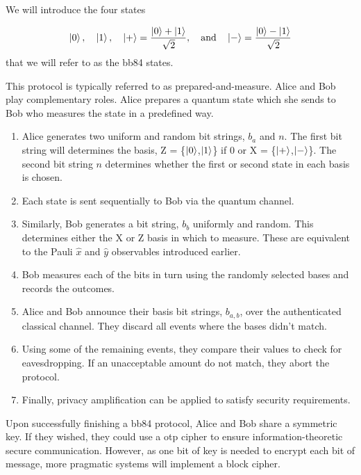 We will introduce the four states

\begin{equation}
	\ket{0}, \quad \ket{1}, \quad \ket{+} = \frac{\ket{0} + \ket{1}}{\sqrt{2}}, \quad \text{and} \quad \ket{-} = \frac{\ket{0} - \ket{1}}{\sqrt{2}}
\end{equation}
that we will refer to as the \ac{bb84} states.

This protocol is typically referred to as {\color{bristol-red}prepared-and-measure}. Alice and Bob play complementary roles. Alice {\color{bristol-red}prepares} a quantum state which she sends to Bob who {\color{bristol-red}measures} the state in a predefined way. 

\begin{algorithm}
\begin{enumerate}
	\item Alice generates two uniform and random bit strings, $b_a$ and $n$. The first bit string will determines the basis, Z = \{$\ket{0}$,$\ket{1}$\} if 0 or X =  \{$\ket{+}$,$\ket{-}$\}. The second bit string $n$ determines whether the first or second state in each basis is chosen. 
	\item Each state is sent sequentially to Bob via the quantum channel.
	\item Similarly, Bob generates a bit string, $b_b$ uniformly and random. This determines either the X or Z basis in which to measure. These are equivalent to the Pauli $\hat{x}$ and $\hat{y}$ observables introduced earlier.
	\item Bob measures each of the bits in turn using the randomly selected bases and records the outcomes.
	\item Alice and Bob announce their basis bit strings, $b_{a,b}$, over the authenticated classical channel. They discard all events where the bases didn't match.
	\item Using some of the remaining events, they compare their values to check for eavesdropping. If an unacceptable amount do not match, they abort the protocol.
	\item Finally, privacy amplification can be applied to satisfy security requirements.
\end{enumerate}
\end{algorithm}

Upon successfully finishing a \ac{bb84} protocol, Alice and Bob share a symmetric key. If they wished, they could use a \ac{otp} cipher to ensure information-theoretic secure communication. However, as one bit of key is needed to encrypt each bit of message, more pragmatic systems will implement a block cipher. 

